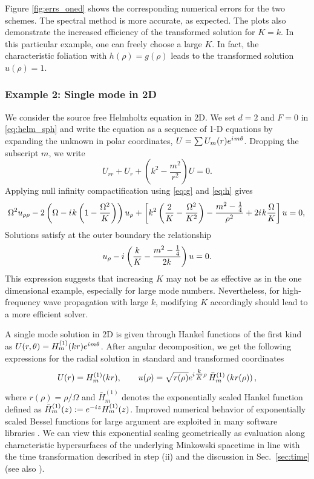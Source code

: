 \documentclass[final,onefignum,onetabnum]{siamart190516}
\newcommand{\iu}{{i\mkern1mu}}
\begin{document}
Figure \ref{fig:errs_oned} shows the corresponding numerical errors for the two schemes. The spectral method is more accurate, as expected. The plots also demonstrate the increased efficiency of the transformed solution for $K=k$. In this particular example, one can freely choose a large $K$. In fact, the characteristic foliation with $h(\rho) =g(\rho)$ leads to the transformed solution $u(\rho)=1$. 

\subsubsection{Example 2: Single mode in 2D} 
We consider the source free Helmholtz equation in 2D. We set $d=2$ and $F=0$ in \eqref{eq:helm_sph} and write the equation as a sequence of 1-D equations by expanding the unknown in polar coordinates, $U=\sum U_m(r) e^{\iu m \theta}$. Dropping the subscript $m$, we write
\begin{equation}
	 U_{rr} + U_r + \left(k^2 - \frac{m^2}{r^2}\right)U = 0.
\end{equation}
Applying null infinity compactification using \eqref{eq:g} and \eqref{eq:h} gives 
\begin{equation}
\label{eq:hyp_2d}
	\Omega^2 u_{\rho\rho} - 2 \left(\Omega-\iu k \left(1-\frac{\Omega^2}{K}\right) \right) u_\rho + \left[k^2 \left(\frac{2}{K}-\frac{\Omega^2}{K^2}\right) - \frac{m^2-\tfrac{1}{4}}{\rho^2}  + 2 \iu k \frac{\Omega}{K} \right] u = 0,\\
\end{equation}
Solutions satisfy at the outer boundary the relationship
\[ u_\rho - \iu \left(\frac{k}{K} - \frac{m^2-\tfrac{1}{4}}{2k}\right)u = 0.  \]
This expression suggests that increasing $K$ may not be as effective as in the one dimensional example, especially for large mode numbers. Nevertheless, for high-frequency wave propagation with large $k$, modifying $K$ accordingly should lead to a more efficient solver.

A single mode solution in 2D is given through Hankel functions of the first kind as  $U(r, \theta) = H_m^{(1)}(k r) e^{\iu m \theta}$. After angular decomposition, we get the following expressions for the radial solution in standard and transformed coordinates
\begin{equation}\label{eq:hankel_soln}
	U(r) = H_m^{(1)}(k r), \qquad u(\rho) = \sqrt{r(\rho)} e^{\iu \tfrac{k}{K} \rho} \, \bar{H}_m^{(1)}\left(k r(\rho)\right),
\end{equation}
where $r(\rho)=\rho/\Omega$ and $\bar{H}_{m}^{(1)}$ denotes the exponentially scaled Hankel function defined as $\bar{H}_{m}^{(1)}(z) := e^{-\iu z} H_{m}^{(1)}(z)$. Improved numerical behavior of exponentially scaled Bessel functions for large argument are exploited in many software libraries \cite{amos1986algorithm, 2020SciPy-NMeth}. We can view this exponential scaling geometrically as evaluation along characteristic hypersurfaces of the underlying Minkowski spacetime in line with the time transformation described in step (ii) and the discussion in Sec.~\ref{sec:time} (see also \cite{ZengFramework}).
\end{document}
